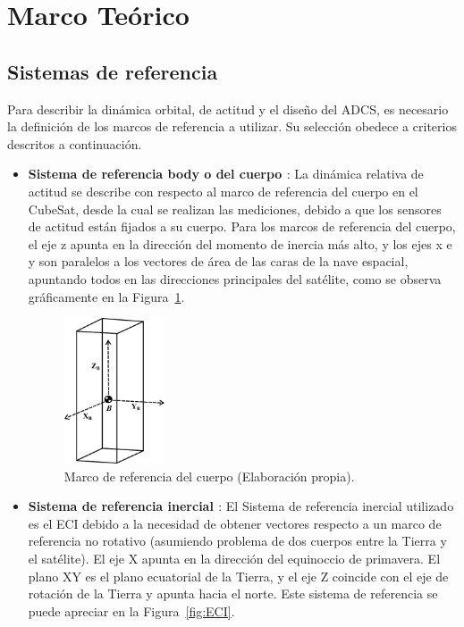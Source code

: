 \section{Marco Teórico}

\subsection{Sistemas de referencia}

Para describir la dinámica orbital, de actitud y el diseño del \gls{ADCS}, es necesario la definición de los marcos de referencia a utilizar. Su selección obedece a criterios descritos a continuación.

\begin{itemize}
	\item \textbf{Sistema de referencia body o del cuerpo \cite{ref21}}: La dinámica relativa de actitud se describe con respecto al marco de referencia del cuerpo en el CubeSat, desde la cual se realizan las mediciones, debido a que los sensores de actitud están fijados a su cuerpo. Para los marcos de referencia del cuerpo, el eje z apunta en la dirección del momento de inercia más alto, y los ejes x e y son paralelos a los vectores de área de las caras de la nave espacial, apuntando todos en las direcciones principales del satélite, como se observa gráficamente en la Figura~\ref{fig:body}.
	
	\begin{figure}[h]
		\centering    
		\includegraphics[width=0.28\textwidth]{body.pdf}
		\caption{Marco de referencia del cuerpo (Elaboración propia).}
		\label{fig:body}
	\end{figure}
	
	\item \textbf{Sistema de referencia inercial \cite{ref21,ref22}}: El Sistema de referencia inercial utilizado es el \gls{ECI} debido a la necesidad de obtener vectores respecto a un marco de referencia no rotativo (asumiendo problema de dos cuerpos entre la Tierra y el satélite). El eje X apunta en la dirección del equinoccio de primavera. El plano XY es el plano ecuatorial de la Tierra, y el eje Z coincide con el eje de rotación de la Tierra y apunta hacia el norte. Este sistema de referencia se puede apreciar en la Figura~\ref{fig:ECI}.
	

\end{itemize}
